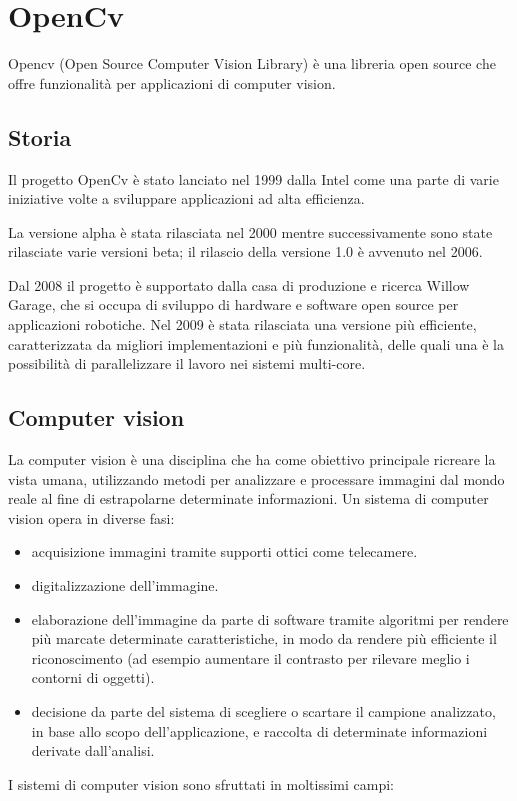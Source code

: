 

\section{OpenCv}
Opencv (Open Source Computer Vision Library) è una libreria open source che offre funzionalità per applicazioni di computer vision.

\subsection{Storia}
Il progetto OpenCv è stato lanciato nel 1999 dalla Intel come una parte di varie iniziative volte a sviluppare applicazioni ad alta efficienza.

La versione alpha è stata rilasciata nel 2000 mentre successivamente sono state rilasciate varie versioni beta; il rilascio della versione 1.0 è avvenuto
nel 2006.

Dal 2008 il progetto è supportato dalla casa di produzione e ricerca Willow Garage, che si occupa di sviluppo di hardware e software open source per applicazioni robotiche. Nel 2009 è stata rilasciata una versione più efficiente, caratterizzata da migliori implementazioni e più funzionalità, delle quali una è la possibilità di parallelizzare il lavoro nei sistemi multi-core.

\subsection{Computer vision}

La computer vision è una disciplina che ha come obiettivo principale ricreare la vista umana, utilizzando metodi per analizzare e processare immagini dal mondo reale al fine di estrapolarne determinate informazioni. Un sistema di computer vision opera in diverse fasi:
\begin{itemize}
\item acquisizione immagini tramite supporti ottici come telecamere.
\item digitalizzazione dell'immagine.
\item elaborazione dell'immagine da parte di software tramite algoritmi per rendere più marcate determinate caratteristiche, in modo da rendere più efficiente il riconoscimento (ad esempio aumentare il contrasto per rilevare meglio i contorni di oggetti).
\item decisione da parte del sistema di scegliere o scartare il campione analizzato, in base allo scopo dell'applicazione, e raccolta di determinate informazioni derivate dall'analisi.
\end{itemize}
I sistemi di computer vision sono sfruttati in moltissimi campi:

